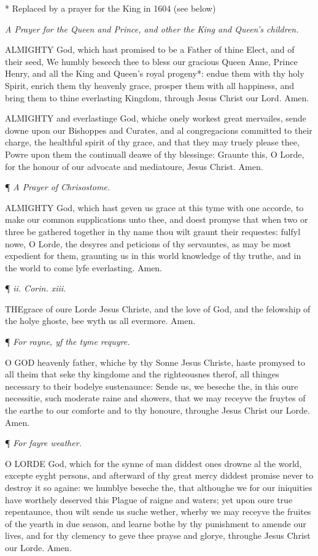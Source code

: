 * Replaced
by a prayer for the King in 1604 (see below)

\emph{A
Prayer for the Queen and Prince, and other the King and Queen's children.}

ALMIGHTY
God, which hast promised to be a Father of thine Elect, and of their seed,
We humbly beseech thee to bless our gracious Queen Anne, Prince Henry,
and all the King and Queen's royal progeny*: endue them with thy holy
Spirit, enrich them thy heavenly grace, prosper them with all happiness,
and bring them to thine everlasting Kingdom, through Jesus Christ our
Lord. Amen.

ALMIGHTY
and everlastinge God, whiche onely workest great mervailes, sende downe
upon our Bishoppes and Curates, and al congregacions committed to their
charge, the healthful spirit of thy grace, and that they may truely please
thee, Powre upon them the continuall deawe of thy blessinge: Graunte this,
O Lorde, for the honour of our advocate and mediatoure, Jesus Christ.
Amen.

¶
\emph{A Prayer of Chrisostome.}

ALMIGHTY
God, which hast geven us grace at this tyme with one accorde, to make
our common supplications unto thee, and doest promyse that when two or
three be gathered together in thy name thou wilt graunt their requestes:
fulfyl nowe, O Lorde, the desyres and peticions of thy servauntes, as
may be most expedient for them, graunting us in this world knowledge of
thy truthe, and in the world to come lyfe everlasting. Amen.

¶
\emph{ii. Corin. xiii.}

THE\textbf{}grace of oure Lorde Jesus Christe, and the love of God, and the felowship
of the holye ghoste, bee wyth us all evermore. Amen.

¶
\emph{For rayne, yf the tyme requyre.}

O GOD
heavenly father, whiche by thy Sonne Jesus Christe, haste promysed to
all theim that seke thy kingdome and the righteousnes therof, all thinges
necessary to their bodelye sustenaunce: Sende us, we beseche the, in this
oure necessitie, such moderate raine and showers, that we may receyve
the fruytes of the earthe to our comforte and to thy honoure, throughe
Jesus Christ our Lorde. Amen.

¶
\emph{For fayre weather.}

O LORDE
God, which for the synne of man diddest ones drowne al the world, excepte
eyght persons, and afterward of thy great mercy diddest promise never
to destroy it so againe: we humblye beseche the, that althoughe we for
our iniquities have worthely deserved this Plague of raigne and waters;
yet upon oure true repentaunce, thou wilt sende us suche wether, wherby
we may receyve the fruites of the yearth in due season, and learne bothe
by thy punishment to amende our lives, and for thy clemency to geve thee
prayse and glorye, throughe Jesus Christ our Lorde. Amen.

